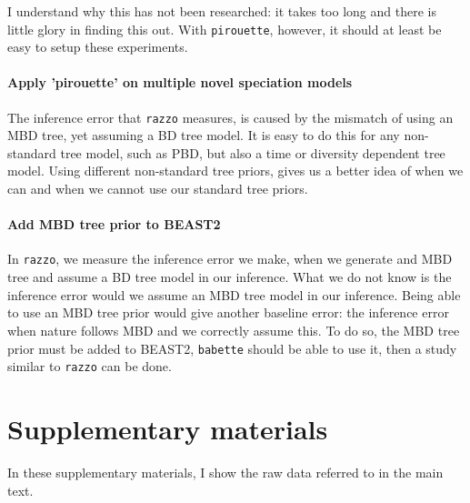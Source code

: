 I understand why this has not been researched: it takes too long
and there is little glory in finding this out. With \verb;pirouette;, however,
it should at least be easy to setup these experiments.

\paragraph{Apply 'pirouette' on multiple novel speciation models} 

The inference error that \verb;razzo; measures, is caused by the
mismatch of using an MBD tree, yet assuming a BD tree model.
It is easy to do this for any non-standard tree model, such as
PBD, but also a time or diversity dependent tree model. Using
different non-standard tree priors, gives us a better idea of when we can
and when we cannot use our standard tree priors.

\paragraph{Add MBD tree prior to BEAST2}

In \verb;razzo;, we measure the inference error we make, when we generate
and MBD tree and assume a BD tree model in our inference. What we
do not know is the inference error would we assume an MBD tree model in
our inference. Being able to use an MBD tree prior would give another
baseline error: the inference error when nature follows MBD and we
correctly assume this. To do so, the MBD tree prior must be added to BEAST2, 
\verb;babette; should be able to use it, then a study similar to \verb;razzo; can be done.


\section{Supplementary materials}

In these supplementary materials, I show the raw data referred to in the main
text.



